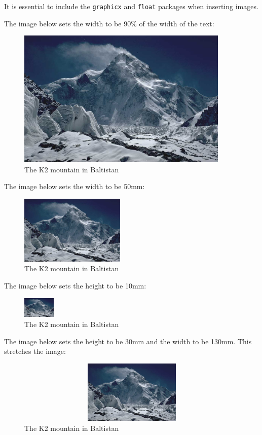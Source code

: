 \documentclass[a4paper,12pt]{article}
\begin{document}
It is essential to include the \texttt{graphicx} and \texttt{float} packages when inserting images.

The image below sets the width to be 90\% of the width of the text:
\begin{figure}[H]
  \centering
  \includegraphics[width=0.9\textwidth]{k2.jpg}
  \caption{The K2 mountain in Baltistan}
\end{figure}

The image below sets the width to be 50mm:
\begin{figure}[H]
  \centering
  \includegraphics[width=50mm]{k2.jpg}
  \caption{The K2 mountain in Baltistan}
\end{figure}

The image below sets the height to be 10mm:
\begin{figure}[H]
  \centering
  \includegraphics[height=10mm]{k2.jpg}
  \caption{The K2 mountain in Baltistan}
\end{figure}

The image below sets the height to be 30mm and the width to be 130mm. This stretches the image:
\begin{figure}[H]
  \centering
  \includegraphics[height=30mm,width=130mm]{k2.jpg}
  \caption{The K2 mountain in Baltistan}
\end{figure}
\end{document}
